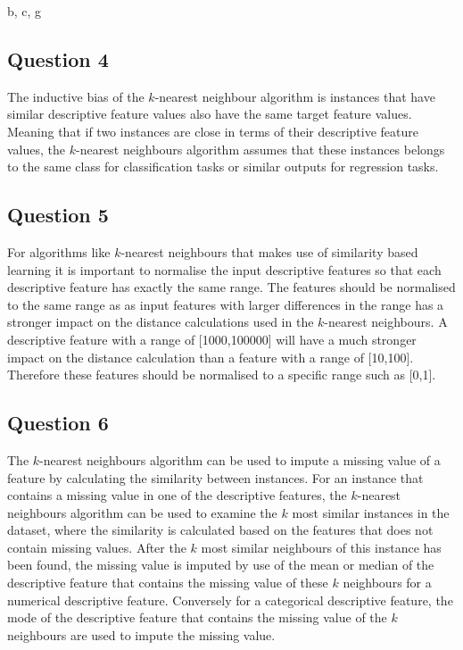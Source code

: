 \documentclass[10pt]{article}
\begin{document}
b, c, g

\subsection*{Question 4}

The inductive bias of the $k$-nearest neighbour algorithm is instances that have similar descriptive feature values
also have the same target feature values. Meaning that if two instances are close in terms of their descriptive feature
values, the $k$-nearest neighbours algorithm assumes that these instances belongs to the same class for classification tasks
or similar outputs for regression tasks.

\subsection*{Question 5}

For algorithms like $k$-nearest neighbours that makes use of similarity based learning it is important to
normalise the input descriptive features so that each descriptive feature has exactly the same range. The
features should be normalised to the same range as as input features with larger differences in the range
has a stronger impact on the distance calculations used in the $k$-nearest neighbours. A descriptive
feature with a range of [1000,100000] will have a much stronger impact on the distance calculation
than a feature with a range of [10,100]. Therefore these features should be normalised to a specific
range such as [0,1].

\subsection*{Question 6}

The $k$-nearest neighbours algorithm can be used to impute a missing value of a feature by calculating the
similarity between instances. For an instance that contains a missing value in one of the descriptive
features, the $k$-nearest neighbours algorithm can be used to examine the $k$ most similar instances
in the dataset, where the similarity is calculated based on the features that does not contain missing values.
After the $k$ most similar neighbours of this instance has been found, the missing value is imputed by use of
the mean or median of the descriptive feature that contains the missing value of these $k$ neighbours for a numerical
descriptive feature. Conversely for a categorical descriptive feature, the mode of the descriptive feature that contains
the missing value of the $k$ neighbours are used to impute the missing value.
\end{document}
